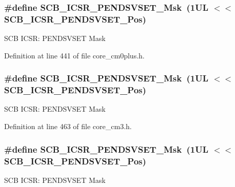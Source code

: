 \subsubsection[{\texorpdfstring{S\+C\+B\+\_\+\+I\+C\+S\+R\+\_\+\+P\+E\+N\+D\+S\+V\+S\+E\+T\+\_\+\+Msk}{SCB_ICSR_PENDSVSET_Msk}}]{\setlength{\rightskip}{0pt plus 5cm}\#define S\+C\+B\+\_\+\+I\+C\+S\+R\+\_\+\+P\+E\+N\+D\+S\+V\+S\+E\+T\+\_\+\+Msk~(1\+U\+L $<$$<$ S\+C\+B\+\_\+\+I\+C\+S\+R\+\_\+\+P\+E\+N\+D\+S\+V\+S\+E\+T\+\_\+\+Pos)}\hypertarget{group___c_m_s_i_s___s_c_b_ga1e40d93efb402763c8c00ddcc56724ff}{}\label{group___c_m_s_i_s___s_c_b_ga1e40d93efb402763c8c00ddcc56724ff}
S\+CB I\+C\+SR\+: P\+E\+N\+D\+S\+V\+S\+ET Mask 

Definition at line 441 of file core\+\_\+cm0plus.\+h.

\subsubsection[{\texorpdfstring{S\+C\+B\+\_\+\+I\+C\+S\+R\+\_\+\+P\+E\+N\+D\+S\+V\+S\+E\+T\+\_\+\+Msk}{SCB_ICSR_PENDSVSET_Msk}}]{\setlength{\rightskip}{0pt plus 5cm}\#define S\+C\+B\+\_\+\+I\+C\+S\+R\+\_\+\+P\+E\+N\+D\+S\+V\+S\+E\+T\+\_\+\+Msk~(1\+U\+L $<$$<$ S\+C\+B\+\_\+\+I\+C\+S\+R\+\_\+\+P\+E\+N\+D\+S\+V\+S\+E\+T\+\_\+\+Pos)}\hypertarget{group___c_m_s_i_s___s_c_b_ga1e40d93efb402763c8c00ddcc56724ff}{}\label{group___c_m_s_i_s___s_c_b_ga1e40d93efb402763c8c00ddcc56724ff}
S\+CB I\+C\+SR\+: P\+E\+N\+D\+S\+V\+S\+ET Mask 

Definition at line 463 of file core\+\_\+cm3.\+h.

\subsubsection[{\texorpdfstring{S\+C\+B\+\_\+\+I\+C\+S\+R\+\_\+\+P\+E\+N\+D\+S\+V\+S\+E\+T\+\_\+\+Msk}{SCB_ICSR_PENDSVSET_Msk}}]{\setlength{\rightskip}{0pt plus 5cm}\#define S\+C\+B\+\_\+\+I\+C\+S\+R\+\_\+\+P\+E\+N\+D\+S\+V\+S\+E\+T\+\_\+\+Msk~(1\+U\+L $<$$<$ S\+C\+B\+\_\+\+I\+C\+S\+R\+\_\+\+P\+E\+N\+D\+S\+V\+S\+E\+T\+\_\+\+Pos)}\hypertarget{group___c_m_s_i_s___s_c_b_ga1e40d93efb402763c8c00ddcc56724ff}{}\label{group___c_m_s_i_s___s_c_b_ga1e40d93efb402763c8c00ddcc56724ff}
S\+CB I\+C\+SR\+: P\+E\+N\+D\+S\+V\+S\+ET Mask 

